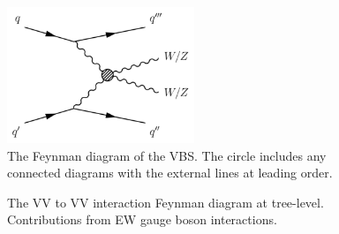 \begin{figure}[tbp]
\begin{center}
 \includegraphics[width=0.50\textwidth,keepaspectratio]{figures/VBS}
\caption{
The Feynman diagram of the VBS. The circle includes any connected diagrams with the external lines at leading order.%
}
\label{fig:VBS}
\end{center}
\end{figure}

\begin{figure}[tbp]
\begin{center}
\caption{
The VV to VV interaction Feynman diagram at tree-level. Contributions from EW gauge boson interactions.
}
\label{fig:VBSEW}
\end{center}
\end{figure}

